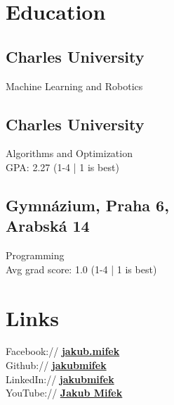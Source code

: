 \documentclass[]{resume}
\begin{document}
%
%
\lastupdated

%
%

%
%

\begin{minipage}[t]{0.33\textwidth} 


\section{Education} 

\subsection{Charles University}
Machine Learning and Robotics \\
\sectionsep

\subsection{Charles University}
Algorithms and Optimization \\
GPA: 2.27 (1-4 | 1 is best)
\sectionsep

\subsection{Gymnázium, Praha 6, \\
Arabská 14
}
Programming \\
Avg grad score: 1.0 (1-4 | 1 is best)
\sectionsep


\section{Links} 
Facebook:// \href{https://facebook/jakub.mifek}{\bf jakub.mifek} \\
Github:// \href{https://github.com/jakubmifek}{\bf jakubmifek} \\
LinkedIn://  \href{https://www.linkedin.com/in/jakubmifek}{\bf jakubmifek} \\
YouTube://  \href{https://www.youtube.com/channel/UCuiryNhBEiADWI5heP6tusA}{\bf Jakub Mifek} \\
\sectionsep


\end{minipage}
\end{document}
